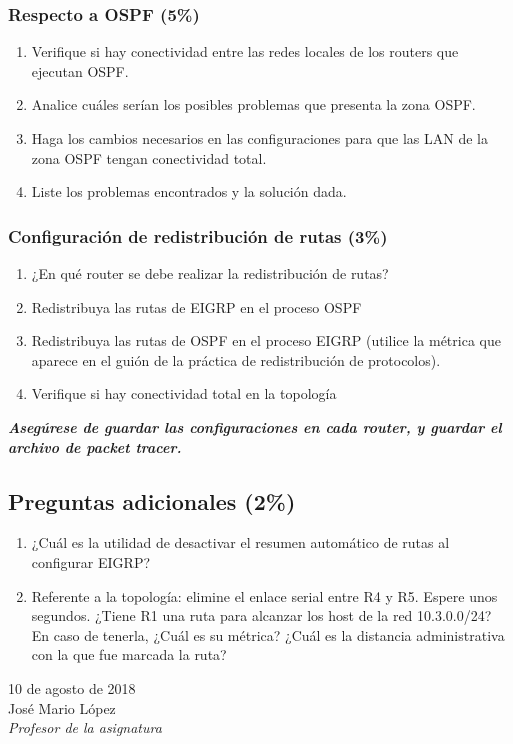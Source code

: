 \documentclass[12pt]{article}
\begin{document}
\subsubsection{Respecto a \textbf{OSPF} (5\%)}
\begin{enumerate}
\item Verifique si hay conectividad entre las redes locales de los routers que ejecutan OSPF.
\item Analice cuáles serían los posibles problemas que presenta la zona OSPF.
\item Haga los cambios necesarios en las configuraciones para que las LAN de la zona OSPF tengan conectividad total.
\item Liste los problemas encontrados y la solución dada.
\end{enumerate}

\subsubsection{Configuración de redistribución de rutas (3\%)}
\begin{enumerate}
\item ¿En qué router se debe realizar la redistribución de rutas?
\item Redistribuya las rutas de EIGRP en el proceso OSPF
\item Redistribuya las rutas de OSPF en el proceso EIGRP (utilice la métrica que aparece en el guión de la práctica de redistribución de protocolos).
\item Verifique si hay conectividad total en la topología
\end{enumerate}

\textit{\textbf{Asegúrese de guardar las configuraciones en cada router, y guardar el archivo de packet tracer.}}

\subsection{Preguntas adicionales (2\%)}
\begin{enumerate}
\item ¿Cuál es la utilidad de desactivar el resumen automático de rutas al configurar EIGRP?
\item Referente a la topología: elimine el enlace serial entre R4 y R5. Espere unos segundos. ¿Tiene R1 una ruta para alcanzar los host de la red 10.3.0.0/24?
En caso de tenerla, ¿Cuál es su métrica? ¿Cuál es la distancia administrativa con la que fue marcada la ruta?
\end{enumerate}

\vfill
10 de agosto de 2018\\
José Mario López\\
\textit{Profesor de la asignatura}
\end{document}
